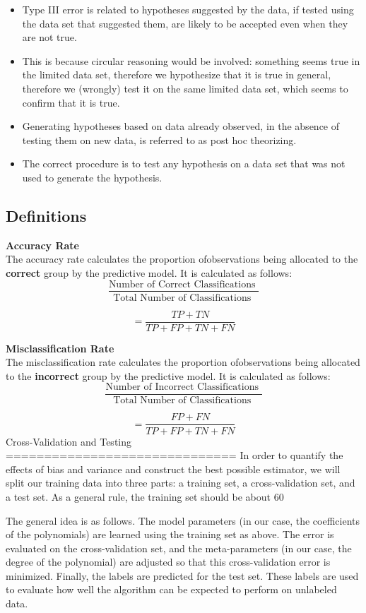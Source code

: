 \documentclass[12pt]{article}
\begin{document}
\begin{itemize}
\item Type III error is related to hypotheses suggested by the data, if tested using the data set that suggested them, are likely to be accepted even when they are not true. 

\item This is because circular reasoning would be involved: something seems true in the limited data set, therefore we hypothesize that it is true in general, therefore we (wrongly) test it on the same limited data set, which seems to confirm that it is true. 

\item Generating hypotheses based on data already observed, in the absence of testing them on new data, is referred to as post hoc theorizing.


\item The correct procedure is to test any hypothesis on a data set that was not used to generate the hypothesis.
\end{itemize}
\subsection*{Definitions}
\textbf{Accuracy Rate}\\
The accuracy rate calculates the proportion ofobservations being allocated to the \textbf{correct} group by the predictive model. It is calculated as follows:
\[ \frac{
\mbox{Number of Correct Classifications }}{\mbox{Total Number of Classifications }} \]

\[ = \frac{TP + TN}{TP+FP+TN+FN}\]


\noindent \textbf{Misclassification Rate}\\
The misclassification rate calculates the proportion ofobservations being allocated to the \textbf{incorrect} group by the predictive model. It is calculated as follows:
\[ \frac{
\mbox{Number of Incorrect Classifications }}{\mbox{Total Number of Classifications }} \]

\[ = \frac{FP + FN}{TP+FP+TN+FN}\]
Cross-Validation and Testing
==============================
In order to quantify the effects of bias and variance and construct the best possible estimator, we will split our training data into three parts: a training set, a cross-validation set, and a test set. As a general rule, the training set should be about 60%

The general idea is as follows. The model parameters (in our case, the coefficients of the polynomials) are learned using the training set as above. The error is evaluated on the cross-validation set, and the meta-parameters (in our case, the degree of the polynomial) are adjusted so that this cross-validation error is minimized. Finally, the labels are predicted for the test set. These labels are used to evaluate how well the algorithm can be expected to perform on unlabeled data.
\end{document}
